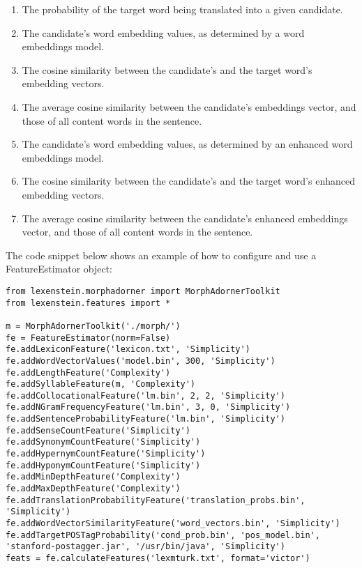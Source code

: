 \begin{itemize}
\begin{enumerate}
	\item The probability of the target word being translated into a given candidate.
	\item The candidate's word embedding values, as determined by a word embeddings model.
	\item The cosine similarity between the candidate's and the target word's embedding vectors.
	\item The average cosine similarity between the candidate's embeddings vector, and those of all content words in the sentence.
	\item The candidate's word embedding values, as determined by an enhanced word embeddings model.
	\item The cosine similarity between the candidate's and the target word's enhanced embedding vectors.
	\item The average cosine similarity between the candidate's enhanced embeddings vector, and those of all content words in the sentence.
\end{enumerate}

\end{itemize}

The code snippet below shows an example of how to configure and use a FeatureEstimator object:

\begin{lstlisting}
from lexenstein.morphadorner import MorphAdornerToolkit
from lexenstein.features import *

m = MorphAdornerToolkit('./morph/')
fe = FeatureEstimator(norm=False)
fe.addLexiconFeature('lexicon.txt', 'Simplicity')
fe.addWordVectorValues('model.bin', 300, 'Simplicity')
fe.addLengthFeature('Complexity')
fe.addSyllableFeature(m, 'Complexity')
fe.addCollocationalFeature('lm.bin', 2, 2, 'Simplicity')
fe.addNGramFrequencyFeature('lm.bin', 3, 0, 'Simplicity')
fe.addSentenceProbabilityFeature('lm.bin', 'Simplicity')
fe.addSenseCountFeature('Simplicity')
fe.addSynonymCountFeature('Simplicity')
fe.addHypernymCountFeature('Simplicity')
fe.addHyponymCountFeature('Simplicity')
fe.addMinDepthFeature('Complexity')
fe.addMaxDepthFeature('Complexity')
fe.addTranslationProbabilityFeature('translation_probs.bin', 'Simplicity')
fe.addWordVectorSimilarityFeature('word_vectors.bin', 'Simplicity')
fe.addTargetPOSTagProbability('cond_prob.bin', 'pos_model.bin', 'stanford-postagger.jar', '/usr/bin/java', 'Simplicity')
feats = fe.calculateFeatures('lexmturk.txt', format='victor')
\end{lstlisting}

